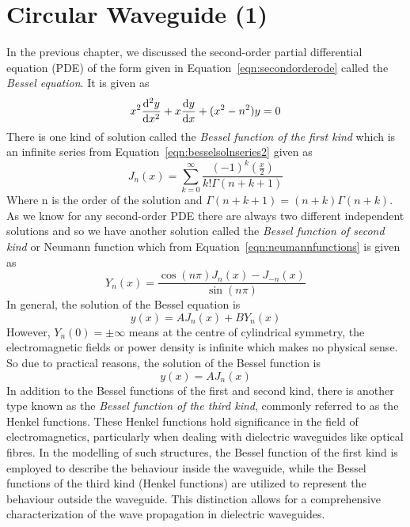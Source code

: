\chapter{Circular Waveguide (1)}\label{lec:lec44}
In the previous chapter, we discussed the second-order partial differential equation (PDE) of the form given in Equation~\eqref{eqn:secondorderode} called the \emph{Bessel equation}\label{bessel equation}. It is given as
\begin{equation*}
x^2\derivative[2]{y}{x} + x\derivative{y}{x} + (x^2-n^2)y = 0
\end{equation*}
There is one kind of solution called the \emph{Bessel function of the first kind} which is an infinite series from Equation~\eqref{eqn:besselsolnseries2} given as
\begin{equation*}
J_n(x) = \sum^\infty_{k=0} \frac{(-1)^k (\frac{x}{2})}{k!\Gamma(n+k+1)}
\end{equation*}
Where n is the order of the solution and $\Gamma(n+k+1) = (n+k)\Gamma(n+k)$. As we know for any second-order PDE there are always two different independent solutions and so we have another solution called the \emph{Bessel function of second kind} or Neumann function which from Equation~\eqref{eqn:neumannfunctions} is given as 
\[
Y_n(x) = \frac{\cos(n\pi)J_n(x)-J_{-n}(x)}{\sin(n\pi)}
\]
In general, the solution of the Bessel equation is
\[
y(x) = A J_n(x) + B Y_n(x)
\]
However, $Y_n(0)=\pm\infty$ means at the centre of cylindrical symmetry, the electromagnetic fields or power density is infinite which makes no physical sense. So due to practical reasons, the solution of the Bessel function is 
\[
y(x) = A J_n(x)
\]
In addition to the Bessel functions of the first and second kind, there is another type known as the \emph{Bessel function of the third kind}, commonly referred to as the Henkel functions. These Henkel functions hold significance in the field of electromagnetics, particularly when dealing with dielectric waveguides like optical fibres. In the modelling of such structures, the Bessel function of the first kind is employed to describe the behaviour inside the waveguide, while the Bessel functions of the third kind (Henkel functions) are utilized to represent the behaviour outside the waveguide. This distinction allows for a comprehensive characterization of the wave propagation in dielectric waveguides.
 
